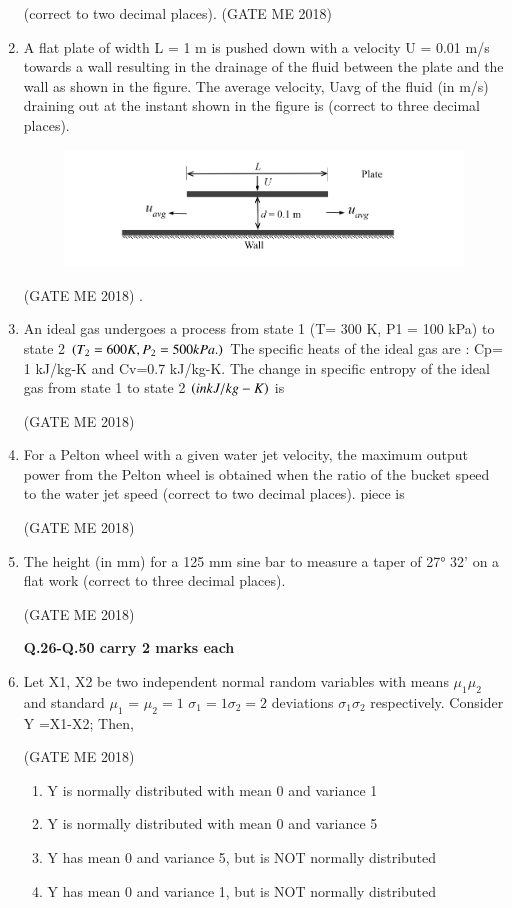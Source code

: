 \documentclass[journal]{IEEEtran}
\numberwithin{equation}{enumi}
\numberwithin{figure}{enumi}
\begin{document}
\begin{enumerate}
(correct to two decimal places).
\hfill{(GATE ME 2018)}
\item A flat plate of width L = 1 m is pushed down with a velocity U = 0.01 m/s towards a wall
resulting in the drainage of the fluid between the plate and the wall as shown in the figure.
The average velocity, Uavg of the fluid (in m/s) draining out at the instant shown in the figure is
(correct to three decimal places).
\begin{figure}[H]
    \centering
    \includegraphics[width = 0.6\columnwidth]{figs/fig3.4.png}
    \caption*{}
    \label{fig:Q22}
    \end{figure}
    \hfill{(GATE ME 2018)}
 .
 \item 
An ideal gas undergoes a process from state 1 (T= 300 K, P1 = 100 kPa) to state 2 $\left(T_2=600 K, P_2= 500 kPa.\right)$ The specific heats of the ideal gas are : Cp= 1 kJ/kg-K and Cv=0.7 kJ/kg-K. The change in specific entropy of the ideal gas from state 1 to state 2 $\left(in kJ/kg-K\right)$ is

\hfill{(GATE ME 2018)}

\item For a Pelton wheel with a given water jet velocity, the maximum output power from the
Pelton wheel is obtained when the ratio of the bucket speed to the water jet speed
(correct to two decimal places).
piece is

\hfill{(GATE ME 2018)}
\item The height (in mm) for a 125 mm sine bar to measure a taper of 27° 32' on a flat work
(correct to three decimal places).

\hfill{(GATE ME 2018)}

\textbf{Q.26-Q.50 carry 2 marks each}
\item Let X1, X2 be two independent normal random variables with means $\mu_1 \mu_2$ and standard
$\mu_1$ = $\mu_2 =1$  $\sigma_1 =1   \sigma_2 = 2$ 
deviations $\sigma_1   \sigma_2$  respectively. Consider Y =X1-X2;   Then,

\hfill{(GATE ME 2018)}
\begin{enumerate}
\item  Y is normally distributed with mean 0 and variance 1
\item  Y is normally distributed with mean 0 and variance 5
\item Y has mean 0 and variance 5, but is NOT normally distributed
\item  Y has mean 0 and variance 1, but is NOT normally distributed
\end{enumerate}


\end{enumerate}
\end{document}
